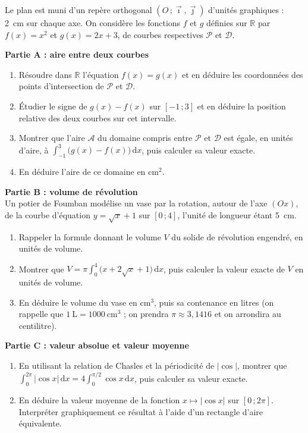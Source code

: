 \documentclass[11pt]{article}
\begin{document}
\begin{exercice}
Le plan est muni d'un repère orthogonal $(O\,;\vec{\imath},\vec{\jmath})$ d'unités graphiques : \SI{2}{cm} sur chaque axe. On considère les fonctions $f$ et $g$ définies sur $\mathbb{R}$ par $f(x)=x^2$ et $g(x)=2x+3$, de courbes respectives $\mathcal{P}$ et $\mathcal{D}$.

\textbf{Partie A : aire entre deux courbes}
\begin{enumerate}
\item Résoudre dans $\mathbb{R}$ l'équation $f(x)=g(x)$ et en déduire les coordonnées des points d'intersection de $\mathcal{P}$ et $\mathcal{D}$.
\item Étudier le signe de $g(x)-f(x)$ sur $[-1\,;3]$ et en déduire la position relative des deux courbes sur cet intervalle.
\item Montrer que l'aire $\mathcal{A}$ du domaine compris entre $\mathcal{P}$ et $\mathcal{D}$ est égale, en unités d'aire, à $\displaystyle\int_{-1}^{3}\big(g(x)-f(x)\big)\,\mathrm{d}x$, puis calculer sa valeur exacte.
\item En déduire l'aire de ce domaine en $\mathrm{cm}^2$.
\end{enumerate}

\textbf{Partie B : volume de révolution}\\
Un potier de Foumban modélise un vase par la rotation, autour de l'axe $(Ox)$, de la courbe d'équation $y=\sqrt{x}+1$ sur $[0\,;4]$, l'unité de longueur étant \SI{5}{cm}.
\begin{enumerate}
\item Rappeler la formule donnant le volume $V$ du solide de révolution engendré, en unités de volume.
\item Montrer que $V=\pi\displaystyle\int_0^4 \big(x+2\sqrt{x}+1\big)\,\mathrm{d}x$, puis calculer la valeur exacte de $V$ en unités de volume.
\item En déduire le volume du vase en $\mathrm{cm}^3$, puis sa contenance en litres (on rappelle que $1\ \mathrm{L}=1000\ \mathrm{cm}^3$ ; on prendra $\pi\approx 3{,}1416$ et on arrondira au centilitre).
\end{enumerate}

\textbf{Partie C : valeur absolue et valeur moyenne}
\begin{enumerate}
\item En utilisant la relation de Chasles et la périodicité de $|\cos|$, montrer que $\displaystyle\int_0^{2\pi} |\cos x|\,\mathrm{d}x = 4\int_0^{\pi/2}\cos x\,\mathrm{d}x$, puis calculer sa valeur exacte.
\item En déduire la valeur moyenne de la fonction $x\mapsto|\cos x|$ sur $[0\,;2\pi]$. Interpréter graphiquement ce résultat à l'aide d'un rectangle d'aire équivalente.
\end{enumerate}
\end{exercice}
\end{document}
